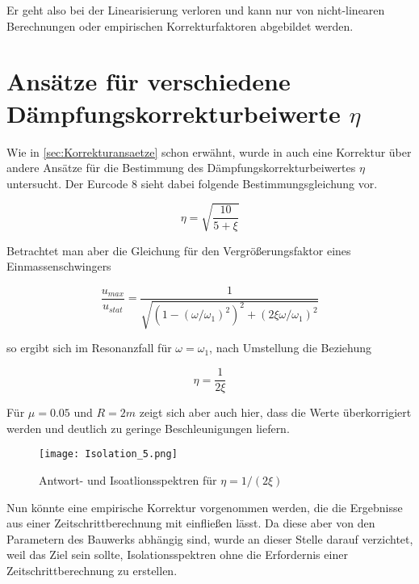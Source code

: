 Er geht also bei der Linearisierung verloren und kann nur von nicht-linearen Berechnungen oder empirischen Korrekturfaktoren abgebildet werden.

\pagebreak

\section{Ansätze für verschiedene Dämpfungskorrekturbeiwerte $\eta$}

Wie in \cref{sec:Korrekturansaetze} schon erwähnt, wurde in \cite{Isemann} auch eine Korrektur über andere Ansätze für die Bestimmung des Dämpfungskorrekturbeiwertes $\eta$ untersucht.
Der Eurcode 8 sieht dabei folgende Bestimmungsgleichung vor.

\begin{equation*}
\eta = \sqrt{\frac{10}{5+\xi}}
\end{equation*}

Betrachtet man aber die Gleichung für den Vergrößerungsfaktor eines Einmassenschwingers

\begin{equation}
\frac{u_{max}}{u_{stat}} = \frac{1}{\sqrt{(1 - (\omega / \omega_1)^2)^2 + (2 \xi \omega / \omega_1)^2}}
\end{equation}

so ergibt sich im Resonanzfall für $\omega = \omega_1$, nach Umstellung die Beziehung

\begin{equation}
\eta = \frac{1}{2\xi}
\end{equation}

Für $\mu = 0.05$ und $R = 2 m$ zeigt sich aber auch hier, dass die Werte überkorrigiert werden und deutlich zu geringe Beschleunigungen liefern.

\begin{figure}[H]
    \centering
    \texttt{[image: Isolation\_5.png]}
    \caption{Antwort- und Isoatlionsspektren für $\eta = 1/(2\xi)$}
    \label{fig:Isolation5}
\end{figure}

Nun könnte eine empirische Korrektur vorgenommen werden, die die Ergebnisse aus einer Zeitschrittberechnung mit einfließen lässt. Da diese aber von den Parametern des Bauwerks abhängig sind, wurde an dieser Stelle darauf verzichtet, weil das Ziel sein sollte, Isolationsspektren ohne die Erfordernis einer Zeitschrittberechnung zu erstellen.

\pagebreak